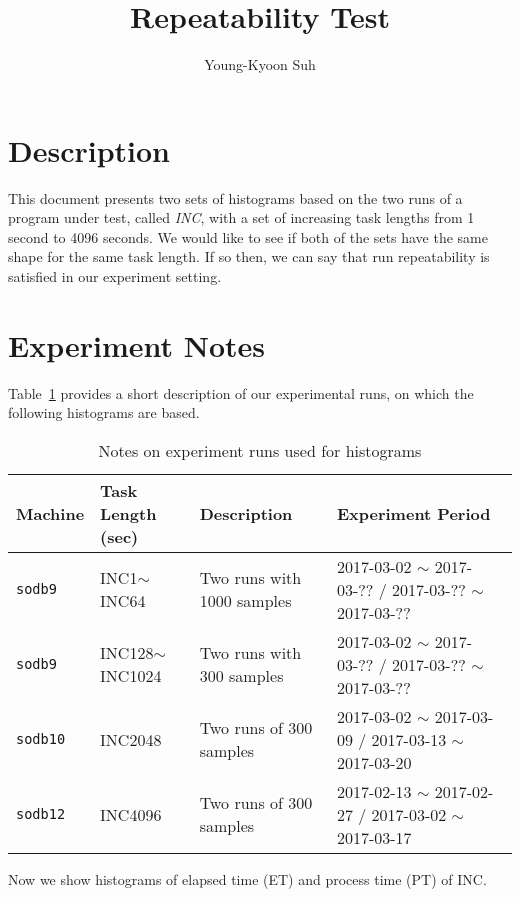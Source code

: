\documentclass[10pt]{article}
\begin{document}
\title{Repeatability Test}

\author{
Young-Kyoon Suh\\
}
\maketitle

\section{Description}
This document presents two sets of histograms based on the two runs 
of a program under test, called {\em INC}, with a set of increasing task lengths 
from 1 second to 4096 seconds.
We would like to see if both of the sets have the same shape for the same task length.
If so then, we can say that run repeatability is satisfied in our experiment setting.

\section{Experiment Notes}
Table~\ref{tab:exp_notes} provides a short description of our experimental runs, 
on which the following histograms are based.

\begin{table}[h]
\begin{center}
\begin{tabular}{|p{2cm}|p{3cm}|p{5cm}|p{5cm}|} \hline
Machine & Task Length (sec) & Description & Experiment Period\\ \hline
{\tt sodb9} &  INC1$\sim$INC64 & Two runs with 1000 samples & 2017-03-02 $\sim$ 2017-03-?? / 2017-03-?? $\sim$ 2017-03-??\\ \hline
{\tt sodb9} &  INC128$\sim$INC1024 & Two runs with 300 samples & 2017-03-02 $\sim$ 2017-03-?? / 2017-03-?? $\sim$ 2017-03-??\\ \hline
{\tt sodb10} & INC2048 & Two runs of 300 samples & 2017-03-02 $\sim$ 2017-03-09 / 2017-03-13 $\sim$ 2017-03-20\\ \hline
{\tt sodb12} & INC4096 & Two runs of 300 samples & 2017-02-13 $\sim$ 2017-02-27 / 2017-03-02 $\sim$ 2017-03-17\\ \hline
\end{tabular}
\end{center}
\vspace{-.2in}
\caption{Notes on experiment runs used for histograms\label{tab:exp_notes}}
\end{table}

Now we show histograms of elapsed time (ET) and process time (PT) of INC. 

\pagebreak



\pagebreak
\newpage


\end{document}
